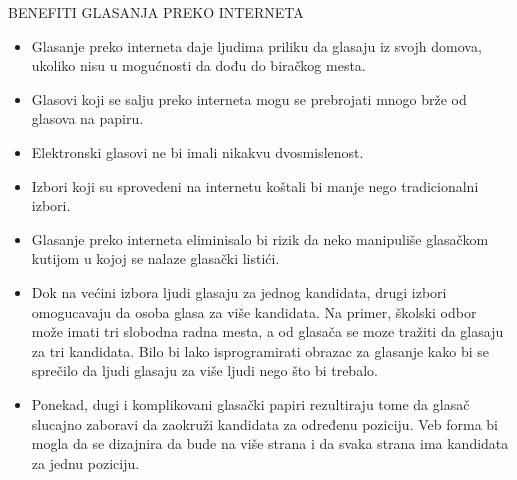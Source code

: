 \documentclass[a4paper]{article}
\theoremstyle{break}
\begin{document}
{\noindent BENEFITI GLASANJA PREKO INTERNETA
\begin{itemize}
\item Glasanje preko interneta daje ljudima priliku da glasaju iz svojh domova, ukoliko nisu u mogućnosti da dođu do biračkog mesta.
\item Glasovi koji se salju preko interneta mogu se prebrojati mnogo brže od glasova na papiru.
\item Elektronski glasovi ne bi imali nikakvu dvosmislenost.
\item Izbori koji su sprovedeni na internetu koštali bi manje nego tradicionalni izbori.
\item Glasanje preko interneta eliminisalo bi rizik da neko manipuliše glasačkom kutijom u kojoj se nalaze glasački listići.
\item Dok na većini izbora ljudi glasaju za jednog kandidata, drugi izbori omogucavaju da osoba glasa za više kandidata. Na primer, školski odbor može imati tri slobodna radna mesta, a od glasača se moze tražiti da glasaju za tri kandidata. Bilo bi lako isprogramirati obrazac za glasanje kako bi se sprečilo da ljudi glasaju za više ljudi nego što bi trebalo.
\item Ponekad, dugi i komplikovani glasački papiri rezultiraju tome da glasač slucajno zaboravi da zaokruži kandidata za određenu poziciju. Veb forma bi mogla da se dizajnira da bude na više strana i da svaka strana ima kandidata za jednu poziciju.
\end{itemize}


}
\end{document}
